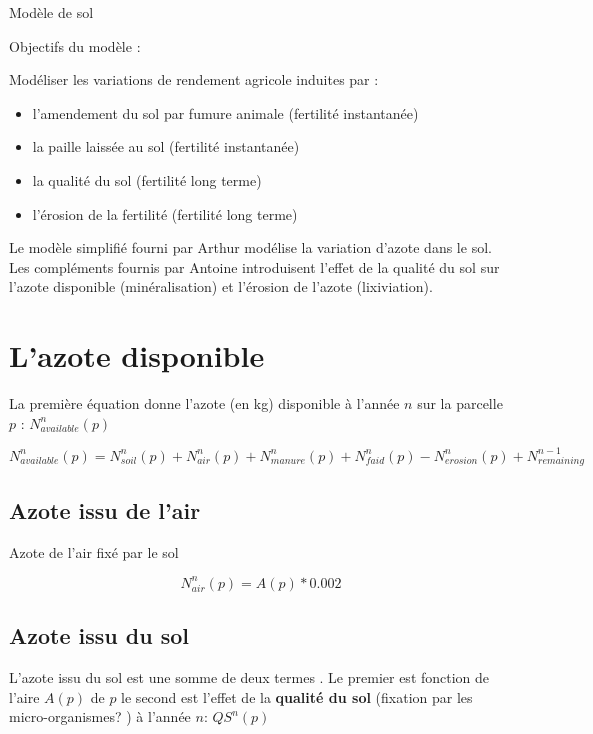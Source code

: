 \documentclass[10pt,a4paper,french]{article} %
\begin{document}
Modèle de sol 

Objectifs du modèle :


Modéliser les variations de rendement agricole induites par : 

\begin{itemize}
	\item l'amendement du sol par fumure animale  (fertilité instantanée)
	\item la paille laissée au sol (fertilité instantanée)
	\item la qualité du sol (fertilité long terme)
	\item l'érosion de la fertilité (fertilité long terme)
\end{itemize} 

\vspace{0.5cm}
Le modèle simplifié fourni par Arthur modélise la variation d'azote dans le sol. 
Les compléments fournis par Antoine introduisent l'effet de la qualité du sol sur l'azote disponible (minéralisation) et l'érosion de l'azote (lixiviation). 



\section{L'azote disponible}



La première équation donne l'azote (en kg) disponible à l'année $n$ sur la parcelle $p$ : $N_{available}^{n}(p)$

\begin{equation}
N_{available}^{n}(p)=N_{soil}^{n}(p)+N_{air}^{n}(p)+N_{manure}^{n}(p)+N_{faid}^{n}(p)-N_{erosion}^n(p) + N_{remaining}^{n-1}
\end{equation}


\subsection{Azote issu de l'air}


Azote de l'air fixé par le sol

\begin{equation}
N_{air}^{n}(p) = A(p) * 0.002
\end{equation}

\subsection{Azote issu du sol}


L'azote issu du sol est une somme de deux termes . Le premier est fonction de l'aire $A(p)$ de $p$ le second est l'effet de la \textbf{qualité du sol} (fixation par les micro-organismes? ) à l'année $n$:  $QS^{n}(p)$
\end{document}
